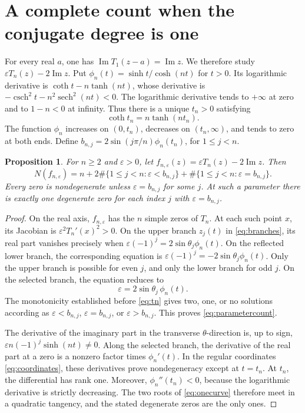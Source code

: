 \documentclass[a4paper]{amsart}
\newtheorem{prop}[thm]{Proposition}
\theoremstyle{remark}
\newcommand{\eps}{\varepsilon}
\DeclareMathOperator{\Ima}{Im}
\DeclareMathOperator{\sech}{sech}
\DeclareMathOperator{\csch}{csch}
\begin{document}
\section{A complete count when the conjugate degree is one}
For every real \(a\), one has \(\Ima T_1(z-a)=\Ima z\).
We therefore study \(\eps T_n(z)-2\Ima z\). Put
\(\phi_n(t)=\sinh t/\cosh(nt)\) for \(t>0\).
Its logarithmic derivative is
\(\coth t-n\tanh(nt)\), whose derivative is
\(-\csch^2t-n^2\sech^2(nt)<0\).
The logarithmic derivative tends to \(+\infty\) at zero and to
\(1-n<0\) at infinity. Thus there is a unique \(t_n>0\) satisfying
\begin{equation}\label{eq:tn}
 \coth t_n=n\tanh(nt_n).
\end{equation}
The function \(\phi_n\) increases on \((0,t_n)\), decreases on
\((t_n,\infty)\), and tends to zero at both ends.
Define \(b_{n,j}=2\sin(j\pi/n)\phi_n(t_n)\), for \(1\le j<n\).

\begin{prop}\label{prop:allparameters}
For \(n\ge2\) and \(\eps>0\), let
\(f_{n,\eps}(z)=\eps T_n(z)-2\Ima z\). Then
\begin{equation}\label{eq:parametercount}
 N(f_{n,\eps})=
 n+2\#\{1\le j<n:\eps<b_{n,j}\}
   +\#\{1\le j<n:\eps=b_{n,j}\}.
\end{equation}
Every zero is nondegenerate unless \(\eps=b_{n,j}\) for some \(j\).
At such a parameter there is exactly one degenerate zero for
each index \(j\) with \(\eps=b_{n,j}\).
\end{prop}

\begin{proof}
On the real axis, \(f_{n,\eps}\) has the \(n\) simple zeros of \(T_n\).
At each such point \(x\), its Jacobian is \(\eps^2T_n'(x)^2>0\).
On the upper branch \(z_j(t)\) in \eqref{eq:branches},
its real part vanishes precisely when
\(\eps(-1)^j=2\sin\theta_j\phi_n(t)\).
On the reflected lower branch, the corresponding equation is
\(\eps(-1)^j=-2\sin\theta_j\phi_n(t)\).
Only the upper branch is possible for even \(j\), and only the lower
branch for odd \(j\). On the selected branch, the equation reduces to
\begin{equation}\label{eq:onecurve}
 \eps=2\sin\theta_j\,\phi_n(t).
\end{equation}
The monotonicity established before \eqref{eq:tn} gives two, one,
or no solutions according as \(\eps<b_{n,j}\),
\(\eps=b_{n,j}\), or \(\eps>b_{n,j}\). This proves
\eqref{eq:parametercount}.

The derivative of the imaginary part in the transverse
\(\theta\)-direction is, up to sign,
\(\eps n(-1)^j\sinh(nt)\ne0\). Along the selected branch, the
derivative of the real part at a zero is a nonzero factor times
\(\phi_n'(t)\). In the regular coordinates \eqref{eq:coordinates},
these derivatives prove nondegeneracy except at \(t=t_n\).
At \(t_n\), the differential has rank one. Moreover,
\(\phi_n''(t_n)<0\), because the logarithmic derivative is strictly
decreasing. The two roots of \eqref{eq:onecurve} therefore meet in a
quadratic tangency, and the stated degenerate zeros are the only ones.
\end{proof}
\end{document}

